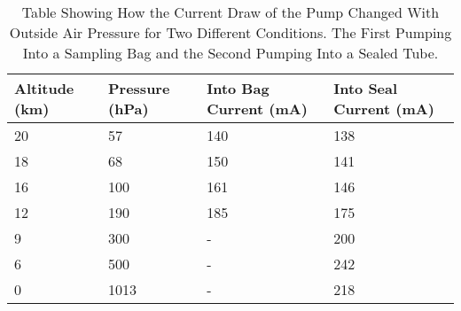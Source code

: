 \begin{table}[H]
\centering

\begin{tabular}{|l|l|l|l|}
\hline
\textbf{Altitude (km)} & \textbf{Pressure (hPa)} & \textbf{Into Bag Current (mA)} & \textbf{Into Seal Current (mA)} \\ \hline
20 & 57 & 140 & 138 \\ \hline
18 & 68 & 150 & 141 \\ \hline
16 & 100 & 161 & 146 \\ \hline
12 & 190 & 185 & 175 \\ \hline
9 & 300 & - & 200 \\ \hline
6 & 500 & - & 242 \\ \hline
0 & 1013 & - & 218 \\ \hline
\end{tabular}
\caption{Table Showing How the Current Draw of the Pump Changed With Outside Air Pressure for Two Different Conditions. The First Pumping Into a Sampling Bag and the Second Pumping Into a Sealed Tube.}
\label{tab:pumpcurrentpressure}
\end{table}